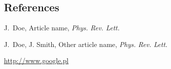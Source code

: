 \documentclass[final]{beamer}
\begin{document}
\begin{frame}[t]
\begin{multicols}{3}

\subsection{References}

\begin{thebibliography}{99}

 J.~Doe, Article name, \textit{Phys. Rev. Lett.}

 J.~Doe, J. Smith, Other article name, \textit{Phys. Rev. Lett.}

 \url{http://www.google.pl}

\end{thebibliography}

\end{multicols}

\end{frame}
\end{document}
